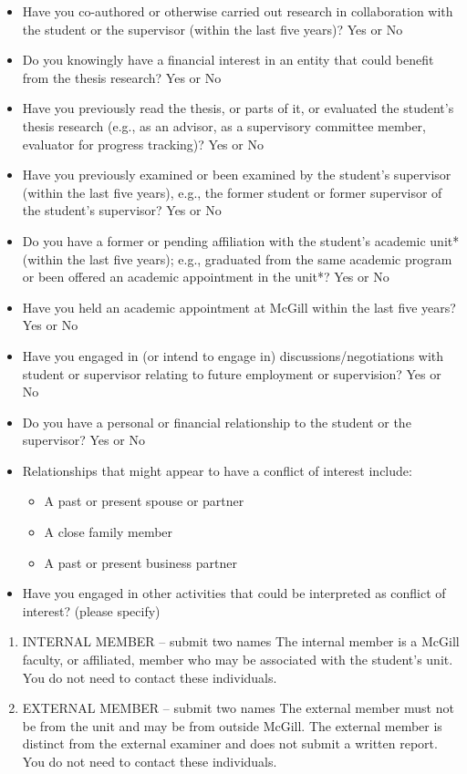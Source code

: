 \documentclass[
  openany]{book}
\providecommand{\tightlist}{%
  \setlength{\itemsep}{0pt}\setlength{\parskip}{0pt}}
\begin{document}
\begin{itemize}
\tightlist
\item
  Have you co-authored or otherwise carried out research in collaboration with the student or the supervisor (within the last five years)? Yes or No
\item
  Do you knowingly have a financial interest in an entity that could benefit from the thesis research? Yes or No
\item
  Have you previously read the thesis, or parts of it, or evaluated the student's thesis research (e.g., as an advisor, as a supervisory committee member, evaluator for progress tracking)? Yes or No
\item
  Have you previously examined or been examined by the student's supervisor (within the last five years), e.g., the former student or former supervisor of the student's supervisor? Yes or No
\item
  Do you have a former or pending affiliation with the student's academic unit* (within the last five years); e.g., graduated from the same academic program or been offered an academic appointment in the unit*? Yes or No
\item
  Have you held an academic appointment at McGill within the last five years? Yes or No
\item
  Have you engaged in (or intend to engage in) discussions/negotiations with student or supervisor relating to future employment or supervision? Yes or No
\item
  Do you have a personal or financial relationship to the student or the supervisor? Yes or No
\item
  Relationships that might appear to have a conflict of interest include:

  \begin{itemize}
  \tightlist
  \item
    A past or present spouse or partner
  \item
    A close family member
  \item
    A past or present business partner
  \end{itemize}
\item
  Have you engaged in other activities that could be interpreted as conflict of interest? (please specify)
\end{itemize}

\begin{enumerate}
\def\labelenumi{\arabic{enumi}.}
\setcounter{enumi}{2}
\item
  INTERNAL MEMBER -- submit two names
  The internal member is a McGill faculty, or affiliated, member who may be associated with the student's unit. You do not need to contact these individuals.
\item
  EXTERNAL MEMBER -- submit two names
  The external member must not be from the unit and may be from outside McGill. The external member is distinct from the external examiner and does not submit a written report. You do not need to contact these individuals.
\end{enumerate}
\end{document}
